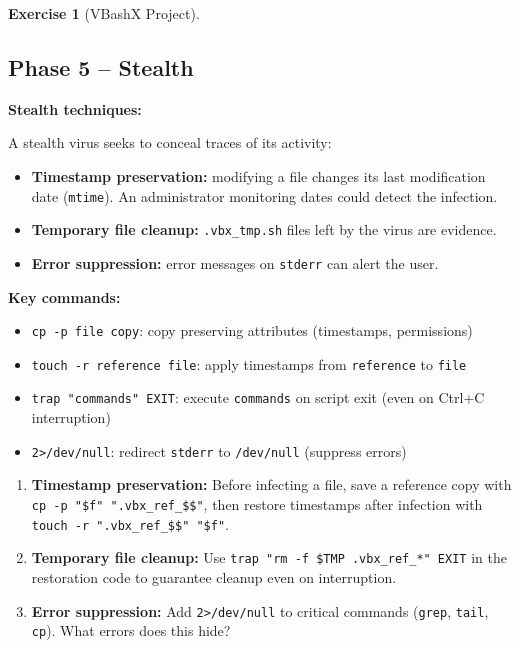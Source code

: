\documentclass[a4paper,11pt]{article}
\theoremstyle{plain}
\theoremstyle{definition}
\newtheorem{exercice}{Exercise}
\begin{document}
\begin{exercice}[VBashX Project]
\subsection*{Phase 5 -- Stealth}

\begin{rappel}
\textbf{Stealth techniques:}

A stealth virus seeks to conceal traces of its activity:
\begin{itemize}
    \item \textbf{Timestamp preservation:} modifying a file changes its last modification date (\texttt{mtime}). An administrator monitoring dates could detect the infection.
    \item \textbf{Temporary file cleanup:} \texttt{.vbx\_tmp.sh} files left by the virus are evidence.
    \item \textbf{Error suppression:} error messages on \texttt{stderr} can alert the user.
\end{itemize}

\textbf{Key commands:}
\begin{itemize}
    \item \texttt{cp -p file copy}: copy preserving attributes (timestamps, permissions)
    \item \texttt{touch -r reference file}: apply timestamps from \texttt{reference} to \texttt{file}
    \item \texttt{trap "commands" EXIT}: execute \texttt{commands} on script exit (even on Ctrl+C interruption)
    \item \texttt{2>/dev/null}: redirect \texttt{stderr} to \texttt{/dev/null} (suppress errors)
\end{itemize}
\end{rappel}

\begin{enumerate}
\item[\textbf{5a)}] \textbf{Timestamp preservation:} Before infecting a file, save a reference copy with \texttt{cp -p "\$f" ".vbx\_ref\_\$\$"}, then restore timestamps after infection with \texttt{touch -r ".vbx\_ref\_\$\$" "\$f"}.

\item[\textbf{5b)}] \textbf{Temporary file cleanup:} Use \texttt{trap "rm -f \$TMP .vbx\_ref\_*" EXIT} in the restoration code to guarantee cleanup even on interruption.

\item[\textbf{5c)}] \textbf{Error suppression:} Add \texttt{2>/dev/null} to critical commands (\texttt{grep}, \texttt{tail}, \texttt{cp}). What errors does this hide?
\end{enumerate}


\end{exercice}
\end{document}
